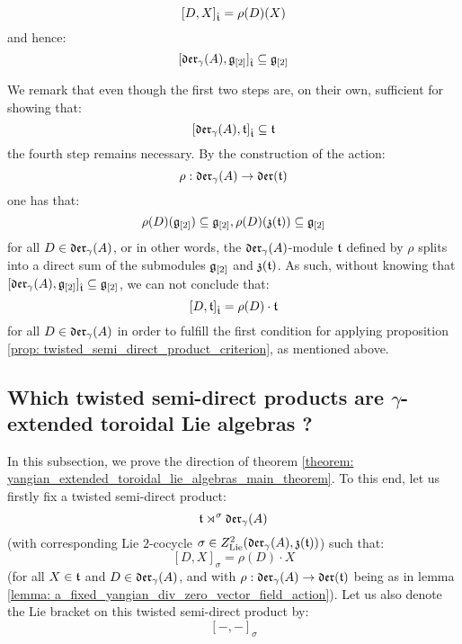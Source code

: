 \begin{itemize}
\begin{enumerate}
                    $$[D, X]_{\hat{\mathfrak{t}}} = \rho(D)(X)$$
                and hence:
                    $$[\mathfrak{der}_{\gamma}(A), \mathfrak{g}_{[2]}]_{\hat{\mathfrak{t}}} \subseteq \mathfrak{g}_{[2]}$$
            \end{enumerate}
            We remark that even though the first two steps are, on their own, sufficient for showing that:
                $$[\mathfrak{der}_{\gamma}(A), \mathfrak{t}]_{\hat{\mathfrak{t}}} \subseteq \mathfrak{t}$$
            the fourth step remains necessary. By the construction of the action:
                $$\rho: \mathfrak{der}_{\gamma}(A) \to \mathfrak{der}(\mathfrak{t})$$
            one has that:
                $$\rho(D)(\mathfrak{g}_{[2]}) \subseteq \mathfrak{g}_{[2]}, \rho(D)(\mathfrak{z}(\mathfrak{t})) \subseteq \mathfrak{g}_{[2]}$$
            for all $D \in \mathfrak{der}_{\gamma}(A)$, or in other words, the $\mathfrak{der}_{\gamma}(A)$-module $\mathfrak{t}$ defined by $\rho$ splits into a direct sum of the submodules $\mathfrak{g}_{[2]}$ and $\mathfrak{z}(\mathfrak{t})$. As such, without knowing that $[\mathfrak{der}_{\gamma}(A), \mathfrak{g}_{[2]}]_{\hat{\mathfrak{t}}} \subseteq \mathfrak{g}_{[2]}$, we can not conclude that:
                $$[D, \mathfrak{t}]_{\hat{\mathfrak{t}}} = \rho(D) \cdot \mathfrak{t}$$
            for all $D \in \mathfrak{der}_{\gamma}(A)$ in order to fulfill the first condition for applying proposition \ref{prop: twisted_semi_direct_product_criterion}, as mentioned above.
        \end{itemize}

    \subsection{Which twisted semi-direct products are \texorpdfstring{$\gamma$}{}-extended toroidal Lie algebras ?} \label{subsection: which_twisted_semi_direct_products_are_yangian_extended_toroidal_lie_algebras}
        In this subsection, we prove the  direction of theorem \ref{theorem: yangian_extended_toroidal_lie_algebras_main_theorem}. To this end, let us firstly fix a twisted semi-direct product:
            $$\mathfrak{t} \rtimes^{\sigma} \mathfrak{der}_{\gamma}(A)$$
        (with corresponding Lie $2$-cocycle $\sigma \in Z^2_{\mathrm{Lie}}(\mathfrak{der}_{\gamma}(A), \mathfrak{z}(\mathfrak{t}))$) such that:
            $$[D, X]_{\sigma} = \rho(D) \cdot X$$
        (for all $X \in \mathfrak{t}$ and $D \in \mathfrak{der}_{\gamma}(A)$, and with $\rho: \mathfrak{der}_{\gamma}(A) \to \mathfrak{der}(\mathfrak{t})$ being as in lemma \ref{lemma: a_fixed_yangian_div_zero_vector_field_action}). Let us also denote the Lie bracket on this twisted semi-direct product by:
            $$[-, -]_{\sigma}$$

